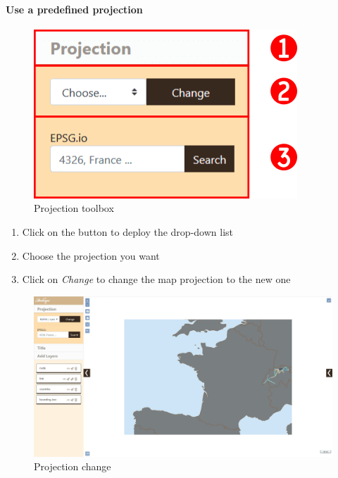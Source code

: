 \documentclass[]{book}
\providecommand{\tightlist}{%
  \setlength{\itemsep}{0pt}\setlength{\parskip}{0pt}}
\let\oldparagraph\paragraph
\renewcommand{\paragraph}[1]{\oldparagraph{#1}\mbox{}}
\begin{document}
\hypertarget{use-a-predefined-projection}{%
\paragraph{Use a predefined projection}\label{use-a-predefined-projection}}

\begin{figure}
\centering
\includegraphics{images/functions/05_functions_swiss_example_projection_tool.png}
\caption{Projection toolbox}
\end{figure}

\begin{enumerate}
\def\labelenumi{\arabic{enumi}.}
\tightlist
\item
  Click on the button to deploy the drop-down list
\item
  Choose the projection you want
\item
  Click on \emph{Change} to change the map projection to the new one
\end{enumerate}

\begin{figure}
\centering
\includegraphics{images/functions/07_functions_swiss_example_projection_change.png}
\caption{Projection change}
\end{figure}
\end{document}
